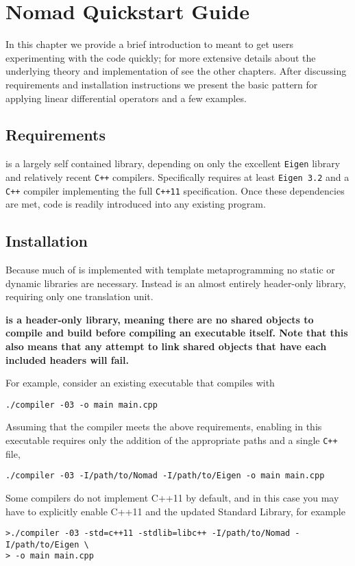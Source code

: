 \chapter{Nomad Quickstart Guide}

In this chapter we provide a brief introduction to \nomad meant
to get users experimenting with the code quickly; for more extensive
details about the underlying theory and implementation of \nomad
see the other chapters.  After discussing requirements and
installation instructions we present the basic \nomad pattern for
applying linear differential operators and a few examples.

\section{Requirements}

\nomad is a largely self contained library, depending on only the 
excellent \verb|Eigen| library and relatively recent \verb|C++| compilers.
Specifically \nomad requires at least \verb|Eigen 3.2| and a
\verb|C++| compiler implementing the full \verb|C++11| specification.
Once these dependencies are met, \nomad code is readily introduced 
into any existing program. 

\section{Installation}

Because much of \nomad is implemented with template metaprogramming
no static or dynamic libraries are necessary.  Instead \nomad is
an almost entirely header-only library, requiring only one translation
unit.

\textbf{\nomad is a header-only library, meaning there are no shared objects
to compile and build before compiling an executable itself.  Note that
this also means that any attempt to link shared objects that have each
included \nomad headers will fail.}

For example, consider an existing executable that compiles with
%
\begin{verbatim}
./compiler -03 -o main main.cpp
\end{verbatim}
%
Assuming that the compiler meets the above requirements, enabling \nomad 
in this executable requires only the addition of the appropriate paths and
a single \verb|C++| file,
%
\begin{verbatim}
./compiler -03 -I/path/to/Nomad -I/path/to/Eigen -o main main.cpp
\end{verbatim}
%
Some compilers do not implement C++11 by default, and in
this case you may have to explicitly enable C++11 and the 
updated Standard Library, for example
%
\begin{verbatim}
>./compiler -03 -std=c++11 -stdlib=libc++ -I/path/to/Nomad -I/path/to/Eigen \
> -o main main.cpp
\end{verbatim}

